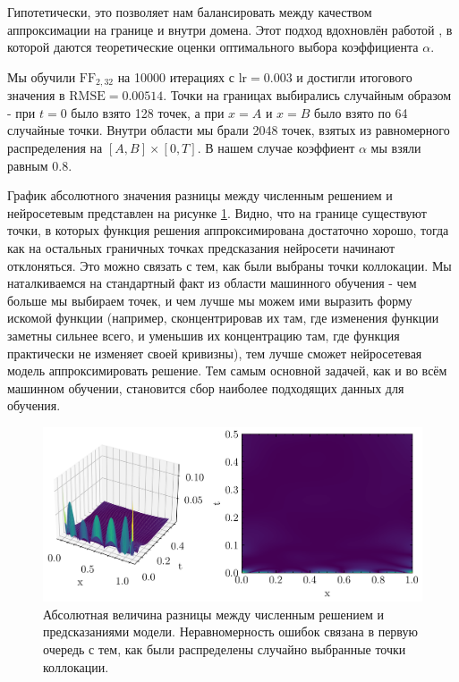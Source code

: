 \documentclass[a4paper, 12pt]{article}
\begin{document}
Гипотетически, это позволяет нам балансировать между качеством аппроксимации на границе и внутри домена. Этот подход вдохновлён работой \cite{vandermeer2021optimally}, в которой даются теоретические оценки оптимального выбора коэффициента $\alpha$.

Мы обучили $\mathrm{FF}_{2, 32}$ на 10000 итерациях с $\mathrm{lr} = 0.003$ и достигли итогового значения в $\mathrm{RMSE} = 0.00514$. Точки на границах выбирались случайным образом - при $t = 0$ было взято 128 точек, а при $x = A$ и $x = B$ было взято по 64 случайные точки. Внутри области мы брали 2048 точек, взятых из равномерного распределения на $[A, B] \times [0, T]$. В нашем случае коэффиент $\alpha$ мы взяли равным $0.8$. 

График абсолютного значения разницы между численным решением и нейросетевым представлен на рисунке \ref{fig:diffusion:error}. Видно, что на границе существуют точки, в которых функция решения аппроксимирована достаточно хорошо, тогда как на остальных граничных точках предсказания нейросети начинают отклоняться. Это можно связать с тем, как были выбраны точки коллокации. Мы наталкиваемся на стандартный факт из области машинного обучения - чем больше мы выбираем точек, и чем лучше мы можем ими выразить форму искомой функции (например, сконцентрировав их там, где изменения функции заметны сильнее всего, и уменьшив их концентрацию там, где функция практически не изменяет своей кривизны), тем лучше сможет нейросетевая модель аппроксимировать решение. Тем самым основной задачей, как и во всём машинном обучении, становится сбор наиболее подходящих данных для обучения.

\begin{figure}[h]
    \centering
    \includegraphics{../images/diffusion/Error.png}
    \caption{Абсолютная величина разницы между численным решением и предсказаниями модели. Неравномерность ошибок связана в первую очередь с тем, как были распределены случайно выбранные точки коллокации.}
    \label{fig:diffusion:error}
\end{figure}
\end{document}
